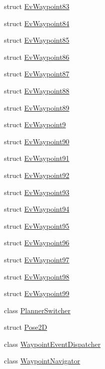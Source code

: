 \begin{DoxyCompactItemize}
struct \hyperlink{structmove__base__z__client_1_1EvWaypoint83}{Ev\+Waypoint83}
\item 
struct \hyperlink{structmove__base__z__client_1_1EvWaypoint84}{Ev\+Waypoint84}
\item 
struct \hyperlink{structmove__base__z__client_1_1EvWaypoint85}{Ev\+Waypoint85}
\item 
struct \hyperlink{structmove__base__z__client_1_1EvWaypoint86}{Ev\+Waypoint86}
\item 
struct \hyperlink{structmove__base__z__client_1_1EvWaypoint87}{Ev\+Waypoint87}
\item 
struct \hyperlink{structmove__base__z__client_1_1EvWaypoint88}{Ev\+Waypoint88}
\item 
struct \hyperlink{structmove__base__z__client_1_1EvWaypoint89}{Ev\+Waypoint89}
\item 
struct \hyperlink{structmove__base__z__client_1_1EvWaypoint9}{Ev\+Waypoint9}
\item 
struct \hyperlink{structmove__base__z__client_1_1EvWaypoint90}{Ev\+Waypoint90}
\item 
struct \hyperlink{structmove__base__z__client_1_1EvWaypoint91}{Ev\+Waypoint91}
\item 
struct \hyperlink{structmove__base__z__client_1_1EvWaypoint92}{Ev\+Waypoint92}
\item 
struct \hyperlink{structmove__base__z__client_1_1EvWaypoint93}{Ev\+Waypoint93}
\item 
struct \hyperlink{structmove__base__z__client_1_1EvWaypoint94}{Ev\+Waypoint94}
\item 
struct \hyperlink{structmove__base__z__client_1_1EvWaypoint95}{Ev\+Waypoint95}
\item 
struct \hyperlink{structmove__base__z__client_1_1EvWaypoint96}{Ev\+Waypoint96}
\item 
struct \hyperlink{structmove__base__z__client_1_1EvWaypoint97}{Ev\+Waypoint97}
\item 
struct \hyperlink{structmove__base__z__client_1_1EvWaypoint98}{Ev\+Waypoint98}
\item 
struct \hyperlink{structmove__base__z__client_1_1EvWaypoint99}{Ev\+Waypoint99}
\item 
class \hyperlink{classmove__base__z__client_1_1PlannerSwitcher}{Planner\+Switcher}
\item 
struct \hyperlink{structmove__base__z__client_1_1Pose2D}{Pose2D}
\item 
class \hyperlink{classmove__base__z__client_1_1WaypointEventDispatcher}{Waypoint\+Event\+Dispatcher}
\item 
class \hyperlink{classmove__base__z__client_1_1WaypointNavigator}{Waypoint\+Navigator}
\end{DoxyCompactItemize}
